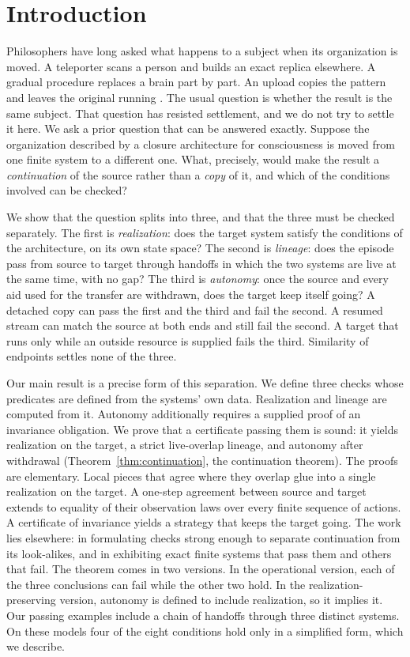 \section{Introduction}
\label{sec:intro}

Philosophers have long asked what happens to a subject when its organization
is moved. A teleporter scans a person and builds an exact replica elsewhere. A
gradual procedure replaces a brain part by part. An upload copies the
pattern and leaves the original running
\citep{Parfit1984, Chalmers2010Singularity, Cerullo2015}. The usual question is
whether the result is the same subject. That question has resisted settlement,
and we do not try to settle it here. We ask a prior question that can be
answered exactly. Suppose the organization described by a closure architecture
for consciousness \citep{TsiokosArchitecture2026} is moved from one finite
system to a different one. What, precisely, would make the result a
\emph{continuation} of the source rather than a \emph{copy} of it, and which of
the conditions involved can be checked?

We show that the question splits into three, and that the three must be
checked separately. The first is \emph{realization}: does the target system
satisfy the conditions of the architecture, on its own state space? The second
is \emph{lineage}: does the episode pass from source to target through handoffs
in which the two systems are live at the same time, with no gap? The third is
\emph{autonomy}: once the source and every aid used for the transfer are
withdrawn, does the target keep itself going? A detached copy can pass the
first and the third and fail the second. A resumed stream can match the
source at both ends and still fail the second. A target that runs only while
an outside resource is supplied fails the third. Similarity of endpoints
settles none of the three.

Our main result is a precise form of this separation. We define three checks
whose predicates are defined from the systems' own data. Realization and
lineage are computed from it. Autonomy additionally requires a supplied proof
of an invariance obligation. We prove that a certificate passing them is sound: it yields
realization on the target, a strict live-overlap lineage, and autonomy after
withdrawal (Theorem~\ref{thm:continuation}, the continuation theorem). The
proofs are elementary. Local pieces that agree where they overlap glue into a
single realization on the target. A one-step agreement between source and
target extends to equality of their observation laws over every finite sequence
of actions. A certificate of invariance
yields a strategy that keeps the target going. The work lies elsewhere: in
formulating checks strong enough to separate continuation from its
look-alikes, and in exhibiting exact finite systems that pass them and others
that fail. The theorem comes in two versions. In the operational version, each
of the three conclusions can fail while the other two hold. In the
realization-preserving version, autonomy is defined to include realization,
so it implies it. Our passing examples include a chain of handoffs through
three distinct systems. On these models four of the eight conditions hold only
in a simplified form, which we describe.

